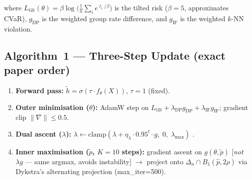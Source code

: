 \documentclass[11pt,a4paper]{article}
\newcommand{\htilde}{\tilde{h}}
\newcommand{\ptilde}{\tilde{p}}
\newcommand{\lDP}{\lambda_{\mathrm{DP}}}
\newcommand{\lIF}{\lambda_{\mathrm{IF}}}
\newcommand{\gDP}{g_{\mathrm{DP}}}
\newcommand{\gIF}{g_{\mathrm{IF}}}
\newcommand{\Ltilt}{L_{\mathrm{tilt}}}
\begin{document}
where $\Ltilt(\theta)=\beta\log\!\bigl(\tfrac{1}{n}\sum_i e^{\ell_i/\beta}\bigr)$
is the tilted risk ($\beta=5$, approximates CVaR), $\gDP$ is the
weighted group rate difference, and $\gIF$ is the weighted $k$-NN violation.

\subsection{Algorithm~1 --- Three-Step Update (exact paper order)}

\begin{enumerate}
\item \textbf{Forward pass:}\; $\htilde = \sigma(\tau\cdot f_\theta(X))$,\quad
      $\tau=1$ (fixed).
\item \textbf{Outer minimisation ($\theta$):}\;
      AdamW step on $\Ltilt+\lDP\gDP+\lIF\gIF$;\;
      gradient clip $\|\nabla\|\le 0.5$.
\item \textbf{Dual ascent ($\lambda$):}\;
      $\lambda \leftarrow \mathrm{clamp}\!\left(\lambda
      +\eta_\lambda\cdot 0.95^t\cdot g,\;0,\;\lambda_{\max}\right)$
      .
\item \textbf{Inner maximisation ($\ptilde$, $K=10$ steps):}\;
      gradient ascent on $g(\theta,\ptilde)$
      [\emph{not} $\lambda g$ --- same argmax, avoids instability]
      $\to$ project onto $\Delta_n\cap B_1(\hat{p},2\rho)$
      via Dykstra's alternating projection (max\_iter=500).
\end{enumerate}
\end{document}
